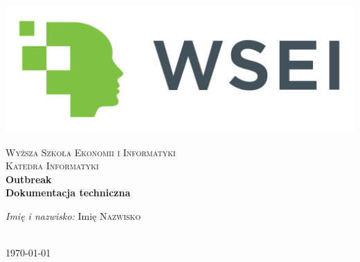 \begin{titlepage}

\begin{center}

\includegraphics[scale=0.08]{Images/logo_wsei.jpg}

\textsc{Wyższa Szkoła Ekonomii i Informatyki}\\[0.2cm]
\vspace{2cm}
\textsc{Katedra Informatyki}\\[1cm]

{\huge \bfseries Outbreak}\\[1cm]

\textbf{Dokumentacja techniczna}\\[1cm]

\vfill

\begin{minipage}{0.8\textwidth}
\begin{flushleft}
{\large \emph{Imię i nazwisko:} } { \hfill Imię  \textsc{Nazwisko}} \newline
\end{flushleft}
\end{minipage}\\[2cm]

\large{\today}

\end{center}

\end{titlepage}

